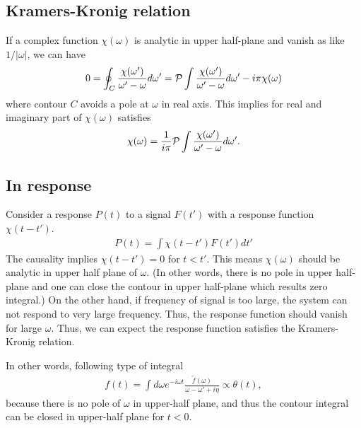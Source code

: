 \documentclass[11pt]{book}
\newcommand{\bea}{\begin{eqnarray}}
\newcommand{\eea}{\end{eqnarray}}
\begin{document}
\subsection{Kramers-Kronig relation}
If a complex function $\chi(\omega)$ is analytic in upper half-plane and vanish 
as like $1/|\omega|$, we can have 
\bea 
0 = \oint_C \frac{\chi(\omega')}{\omega'-\omega} d\omega' 
={\cal P}\int \frac{\chi(\omega')}{\omega'-\omega} d\omega' - i\pi \chi(\omega)
\eea 
where contour $C$ avoids a pole at $\omega$ in real axis.  
This implies for real and imaginary part of $\chi(\omega)$ satisfies 
\bea 
\chi(\omega)=\frac{1}{i\pi}{\cal P}\int \frac{\chi(\omega')}{\omega'-\omega} d\omega'.
\eea 
\subsection{In response}
Consider a response $P(t)$ to a signal $F(t')$ with a response function $\chi(t-t')$.
\bea 
P(t)=\int \chi(t-t')F(t') dt' 
\eea 
The causality implies $\chi(t-t')=0$ for $t<t'$. 
This means $\chi(\omega)$ should be analytic in upper half plane of $\omega$.
(In other words, there is no pole in upper half-plane and one can close
the contour in upper half-plane which results zero integral.)
On the other hand, if frequency of signal is too large, the system can not respond to 
very large frequency. Thus, the response function should vanish for large $\omega$.   
Thus, we can expect the response function satisfies the Kramers-Kronig relation. 

In other words, following type of integral 
\bea 
f(t) = \int d\omega e^{-i\omega t}\frac{\tilde{f}(\omega)}{\omega-\omega'+i\eta}\propto \theta(t),
\eea 
because there is no pole of $\omega$ in upper-half plane, and thus the contour integral can be 
closed in upper-half plane for $t<0$. 
\end{document}
